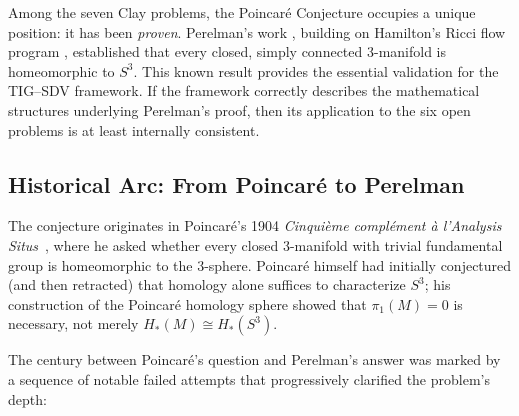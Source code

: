 \documentclass[11pt]{article}
\begin{document}
Among the seven Clay problems, the Poincar\'e Conjecture occupies a
unique position: it has been \emph{proven}.  Perelman's work
\cite{Per1,Per2,Per3}, building on Hamilton's Ricci flow program
\cite{Ham82,Ham86}, established that every closed, simply connected
3-manifold is homeomorphic to $S^3$.  This known result provides the
essential validation for the TIG--SDV framework.  If the framework
correctly describes the mathematical structures underlying Perelman's
proof, then its application to the six open problems is at least
internally consistent.

\subsection{Historical Arc: From Poincar\'e to Perelman}
\label{subsec:history}

The conjecture originates in Poincar\'e's 1904 \emph{Cinqui\`eme
compl\'ement \`a l'Analysis Situs}~\cite{Poincare1904}, where he asked
whether every closed 3-manifold with trivial fundamental group is
homeomorphic to the 3-sphere.  Poincar\'e himself had initially conjectured
(and then retracted) that homology alone suffices to characterize $S^3$;
his construction of the Poincar\'e homology sphere showed that
$\pi_1(M) = 0$ is necessary, not merely $H_*(M) \cong H_*(S^3)$.

The century between Poincar\'e's question and Perelman's answer was
marked by a sequence of notable failed attempts that progressively
clarified the problem's depth:
\end{document}
